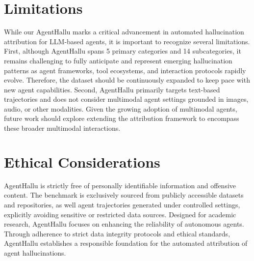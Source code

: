 \section*{Limitations}
While our AgentHallu marks a critical advancement in automated hallucination attribution for LLM-based agents, it is important to recognize several limitations. First, although AgentHallu spans 5 primary categories and 14 subcategories, it remains challenging to fully anticipate and represent emerging hallucination patterns as agent frameworks, tool ecosystems, and interaction protocols rapidly evolve. Therefore, the dataset should be continuously expanded to keep pace with new agent capabilities. Second, AgentHallu primarily targets text-based trajectories and does not consider multimodal agent settings grounded in images, audio, or other modalities. Given the growing adoption of multimodal agents, future work should explore extending the attribution framework to encompass these broader multimodal interactions.


\section*{Ethical Considerations}
AgentHallu is strictly free of personally identifiable information and offensive content. The benchmark is exclusively sourced from publicly accessible datasets and repositories, as well agent trajectories generated under controlled settings, explicitly avoiding sensitive or restricted data sources. Designed for academic research, AgentHallu focuses on enhancing the reliability of autonomous agents. Through adherence to strict data integrity protocols and ethical standards, AgentHallu establishes a responsible foundation for the automated attribution of agent hallucinations.